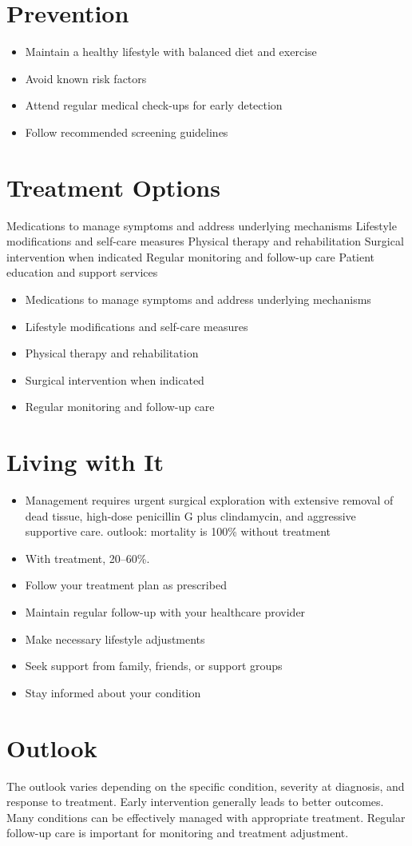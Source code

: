 \section{Prevention}
\begin{itemize}[noitemsep]
  \item Maintain a healthy lifestyle with balanced diet and exercise
  \item Avoid known risk factors
  \item Attend regular medical check-ups for early detection
  \item Follow recommended screening guidelines
\end{itemize}
\section{Treatment Options}
Medications to manage symptoms and address underlying mechanisms Lifestyle modifications and self-care measures Physical therapy and rehabilitation Surgical intervention when indicated Regular monitoring and follow-up care Patient education and support services

\begin{itemize}[noitemsep]
  \item Medications to manage symptoms and address underlying mechanisms
  \item Lifestyle modifications and self-care measures
  \item Physical therapy and rehabilitation
  \item Surgical intervention when indicated
  \item Regular monitoring and follow-up care
\end{itemize}
\section{Living with It}
\begin{itemize}[noitemsep]
  \item Management requires urgent surgical exploration with extensive removal of dead tissue, high-dose penicillin G plus clindamycin, and aggressive supportive care. outlook: mortality is 100\% without treatment
  \item With treatment, 20--60\%.
  \item Follow your treatment plan as prescribed
  \item Maintain regular follow-up with your healthcare provider
  \item Make necessary lifestyle adjustments
  \item Seek support from family, friends, or support groups
  \item Stay informed about your condition
\end{itemize}
\section{Outlook}
The outlook varies depending on the specific condition, severity at diagnosis, and response to treatment. Early intervention generally leads to better outcomes. Many conditions can be effectively managed with appropriate treatment. Regular follow-up care is important for monitoring and treatment adjustment.
